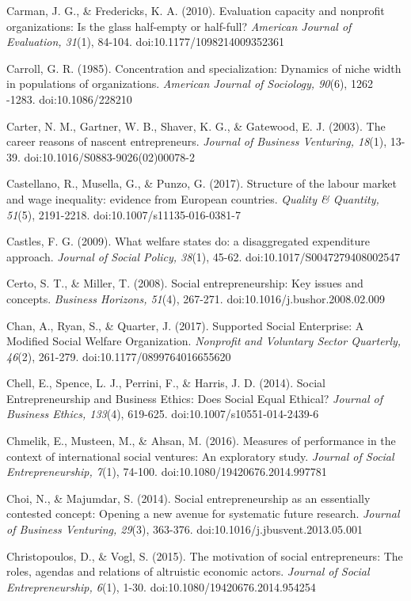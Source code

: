 \documentclass{article}
\begin{document}
Carman, J. G., \& Fredericks, K. A. (2010). Evaluation capacity and nonprofit organizations: Is the glass half-empty or half-full? \emph{American Journal of Evaluation, 31}(1), 84-104. doi:10.1177/1098214009352361

Carroll, G. R. (1985). Concentration and specialization: Dynamics of niche width in populations of organizations. \emph{American Journal of Sociology, 90}(6), 1262 -1283. doi:10.1086/228210

Carter, N. M., Gartner, W. B., Shaver, K. G., \& Gatewood, E. J. (2003). The career reasons of nascent entrepreneurs. \emph{Journal of Business Venturing, 18}(1), 13-39. doi:10.1016/S0883-9026(02)00078-2

Castellano, R., Musella, G., \& Punzo, G. (2017). Structure of the labour market and wage inequality: evidence from European countries. \emph{Quality \& Quantity, 51}(5), 2191-2218. doi:10.1007/s11135-016-0381-7

Castles, F. G. (2009). What welfare states do: a disaggregated expenditure approach. \emph{Journal of Social Policy, 38}(1), 45-62. doi:10.1017/S0047279408002547

Certo, S. T., \& Miller, T. (2008). Social entrepreneurship: Key issues and concepts. \emph{Business Horizons, 51}(4), 267-271. doi:10.1016/j.bushor.2008.02.009

Chan, A., Ryan, S., \& Quarter, J. (2017). Supported Social Enterprise: A Modified Social Welfare Organization. \emph{Nonprofit}\emph{ and Voluntary Sector Quarterly, 46}(2), 261-279. doi:10.1177/0899764016655620

Chell, E., Spence, L. J., Perrini, F., \& Harris, J. D. (2014). Social Entrepreneurship and Business Ethics: Does Social Equal Ethical? \emph{Journal of Business Ethics, 133}(4), 619-625. doi:10.1007/s10551-014-2439-6

Chmelik, E., Musteen, M., \& Ahsan, M. (2016). Measures of performance in the context of international social ventures: An exploratory study. \emph{Journal of Social Entrepreneurship, 7}(1), 74-100. doi:10.1080/19420676.2014.997781

Choi, N., \& Majumdar, S. (2014). Social entrepreneurship as an essentially contested concept: Opening a new avenue for systematic future research. \emph{Journal of Business Venturing, 29}(3), 363-376. doi:10.1016/j.jbusvent.2013.05.001

Christopoulos, D., \& Vogl, S. (2015). The motivation of social entrepreneurs: The roles, agendas and relations of altruistic economic actors. \emph{Journal of Social Entrepreneurship, 6}(1), 1-30. doi:10.1080/19420676.2014.954254
\end{document}
